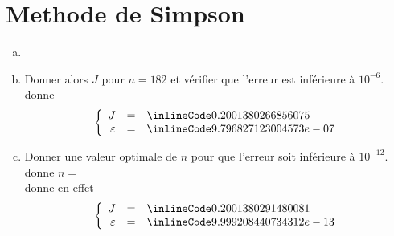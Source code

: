 \section{Methode de Simpson}
\begin{enumerate}[(a)]
  \item


  \item Donner alors $J$ pour $n = 182$ et vérifier que l'erreur est inférieure
        à $10^{-6}$.\\
         donne
        \[
          \left\{
          \begin{array}{rcl}
            J           & = & \il{0.2001380266856075}    \\
            \varepsilon & = & \il{9.796827123004573e-07} \\
          \end{array}
          \right.
        \]

  \item Donner une valeur optimale de $n$ pour que l'erreur soit inférieure à
        $10^{-12}$.
         donne $n =$ \\
         donne en effet
        \[
          \left\{
          \begin{array}{rcl}
            J           & = & \il{0.2001380291480081}    \\
            \varepsilon & = & \il{9.999208440734312e-13} \\
          \end{array}
          \right.
        \]
\end{enumerate}
